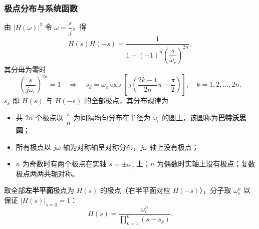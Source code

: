 \subsubsection{极点分布与系统函数}
由 $|H(\omega)|^2$ 令 $\omega=\dfrac{s}{j}$，得
\begin{equation}
H(s)H(-s)=\frac{1}{1+(-1)^n\left(\dfrac{s}{\omega_c}\right)^{2n}},
\end{equation}
其分母为零时
\begin{equation}
\left(\frac{s}{j\omega_c}\right)^{2n}=1\quad\Longrightarrow\quad
s_k=\omega_c\exp\!\left[\,j\!\left(\frac{2k-1}{2n}\pi+\frac{\pi}{2}\right)\right],\quad k=1,2,\dots,2n .
\end{equation}
$s_k$ 即 $H(s)$ 与 $H(-s)$ 的全部极点，其分布规律为
\begin{itemize}
\item 共 $2n$ 个极点以 $\dfrac{\pi}{n}$ 为间隔均匀分布在半径为 $\omega_c$ 的圆上，该圆称为\textbf{巴特沃思圆}；
\item 所有极点以 $j\omega$ 轴为对称轴呈对称分布，$j\omega$ 轴上没有极点；
\item $n$ 为奇数时有两个极点在实轴 $s=\pm\omega_c$ 上；$n$ 为偶数时实轴上没有极点；复数极点两两共轭对称。
\end{itemize}
取全部\textbf{左半平面}极点为 $H(s)$ 的极点（右半平面对应 $H(-s)$），分子取 $\omega_c^n$ 以保证 $|H(s)|_{s=0}=1$：
\begin{equation}
H(s)=\frac{\omega_c^n}{\displaystyle\prod_{k=1}^{n}(s-s_k)} .
\end{equation}


